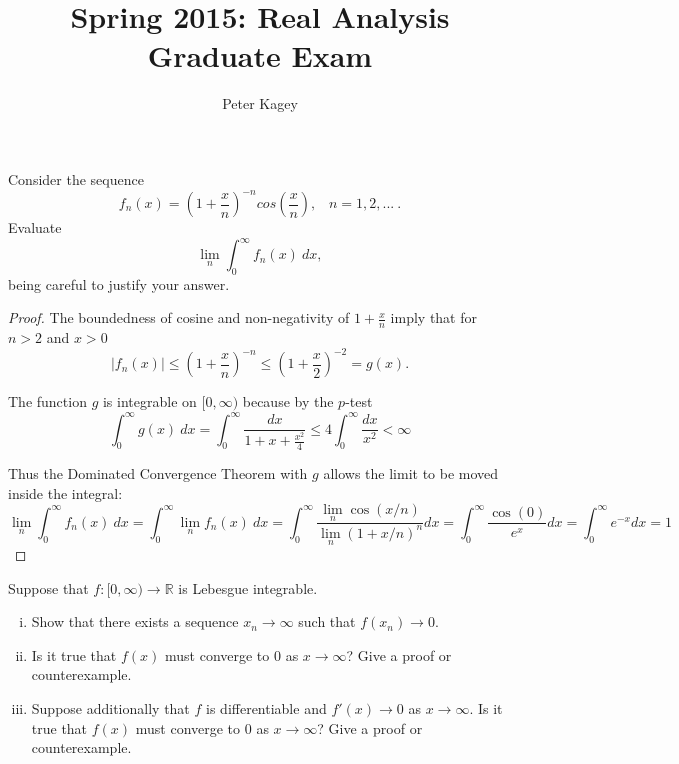 \documentclass{article}
\newenvironment{problem}[2][Problem]{\begin{trivlist}
\item[\hskip \labelsep {\bfseries #1}\hskip \labelsep {\bfseries #2.}]}{\end{trivlist}}
\begin{document}
\title{Spring 2015: Real Analysis Graduate Exam}
\author{Peter Kagey}

\maketitle

\begin{problem}{1}
Consider the sequence \[
	f_n(x)=
    	\left(1 + \frac{x}{n}\right)^{-n} 
        cos\left(\frac{x}{n}\right), 
	\hspace{10pt}
	n = 1,2,...\ .
\] Evaluate \[
	\lim_{n}\int_{0}^{\infty}f_n(x)\ dx,
\] being careful to justify your answer.
\end{problem}

\begin{proof}
The boundedness of cosine and non-negativity of $1 + \frac{x}{n}$ imply that for $n > 2$ and $x > 0$ \[
	\left|f_n(x)\right| \leq 
    \left(1 + \frac{x}{n}\right)^{-n} \leq
    \left(1 + \frac{x}{2}\right)^{-2} =
    g(x).
\]

The function $g$ is integrable on $[0, \infty)$ because by the $p$-test \[
	\int_{0}^{\infty} g(x)\ dx = 
    \int_{0}^{\infty} \frac{dx}{1 + x + \frac{x^2}{4}} \leq
    4\int_{0}^{\infty} \frac{dx}{x^2} <
    \infty
\]

Thus the Dominated Convergence Theorem with $g$ allows the limit to be moved inside the integral:
	\[
	    \lim_{n} \int_{0}^{\infty} f_n(x)\ dx =
        \int_{0}^{\infty} \lim_{n} f_n(x)\ dx =
        \int_{0}^{\infty} \frac{
        	\lim_{n} \cos\left(x/n\right)
        }{
	        \lim_{n} \left(1 + x/n\right)^{n}
        } dx =
        \int_{0}^{\infty} \frac{\cos(0)}{e^x} dx =
        \int_{0}^{\infty} e^{-x} dx =
        1
    \]
\end{proof}

\pagebreak

\begin{problem}{2} Suppose that $f: [0, \infty) \rightarrow \mathbb{R}$ is Lebesgue integrable.
	\begin{enumerate}[(i)]
    	\item Show that there exists a sequence $x_n \rightarrow \infty$ such that $f(x_n) \rightarrow 0$.
        \item Is it true that $f(x)$ must converge to $0$ as $x \rightarrow \infty$? Give a proof or counterexample.
        \item Suppose additionally that $f$ is differentiable and $f'(x) \rightarrow 0$ as $x \rightarrow \infty$. Is it true that $f(x)$ must converge to $0$ as $x \rightarrow \infty$? Give a proof or counterexample.
    \end{enumerate}
\end{problem}
\end{document}

